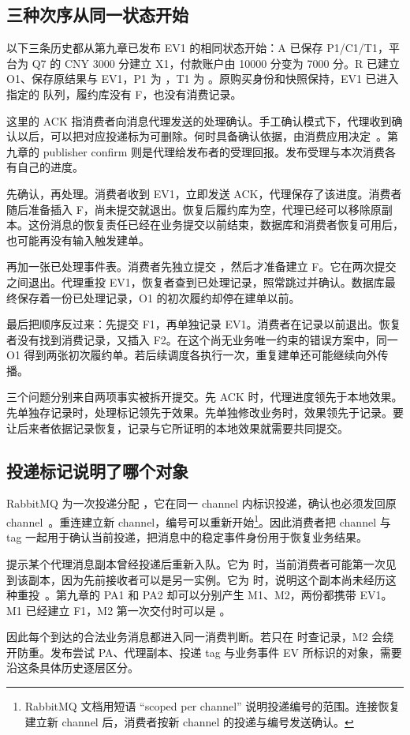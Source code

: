 \subsection*{三种次序从同一状态开始}

以下三条历史都从第九章已发布 EV1 的相同状态开始：A 已保存 P1/C1/T1，平台为 Q7 的 CNY 3000 分建立 X1，付款账户由 10000 分变为 7000 分。R 已建立 O1、保存原结果与 EV1，P1 为 ，T1 为 。原购买身份和快照保持，EV1 已进入指定的  队列，履约库没有 F，也没有消费记录。

这里的 ACK 指消费者向消息代理发送的处理确认。手工确认模式下，代理收到确认以后，可以把对应投递标为可删除。何时具备确认依据，由消费应用决定~\cite{rabbitmq-reliability,rabbitmq-confirms}。第九章的 publisher confirm 则是代理给发布者的受理回报。发布受理与本次消费各有自己的进度。

先确认，再处理。消费者收到 EV1，立即发送 ACK，代理保存了该进度。消费者随后准备插入 F，尚未提交就退出。恢复后履约库为空，代理已经可以移除原副本。这份消息的恢复责任已经在业务提交以前结束，数据库和消费者恢复可用后，也可能再没有输入触发建单。

再加一张已处理事件表。消费者先独立提交 ，然后才准备建立 F。它在两次提交之间退出。代理重投 EV1，恢复者查到已处理记录，照常跳过并确认。数据库最终保存着一份已处理记录，O1 的初次履约却停在建单以前。

最后把顺序反过来：先提交 F1，再单独记录 EV1。消费者在记录以前退出。恢复者没有找到消费记录，又插入 F2。在这个尚无业务唯一约束的错误方案中，同一 O1 得到两张初次履约单。若后续调度各执行一次，重复建单还可能继续向外传播。


三个问题分别来自两项事实被拆开提交。先 ACK 时，代理进度领先于本地效果。先单独存记录时，处理标记领先于效果。先单独修改业务时，效果领先于记录。要让后来者依据记录恢复，记录与它所证明的本地效果就需要共同提交。

\subsection*{投递标记说明了哪个对象}

RabbitMQ 为一次投递分配 ，它在同一 channel 内标识投递，确认也必须发回原 channel~\cite{rabbitmq-confirms}。重连建立新 channel，编号可以重新开始\footnote{RabbitMQ 文档用短语 ``scoped per channel'' 说明投递编号的范围。连接恢复建立新 channel 后，消费者按新 channel 的投递与编号发送确认。}。因此消费者把 channel 与 tag 一起用于确认当前投递，把消息中的稳定事件身份用于恢复业务结果。

 提示某个代理消息副本曾经投递后重新入队。它为  时，当前消费者可能第一次见到该副本，因为先前接收者可以是另一实例。它为  时，说明这个副本尚未经历这种重投~\cite{rabbitmq-reliability}。第九章的 PA1 和 PA2 却可以分别产生 M1、M2，两份都携带 EV1。M1 已经建立 F1，M2 第一次交付时可以是 。

因此每个到达的合法业务消息都进入同一消费判断。若只在  时查记录，M2 会绕开防重。发布尝试 PA、代理副本、投递 tag 与业务事件 EV 所标识的对象，需要沿这条具体历史逐层区分。
